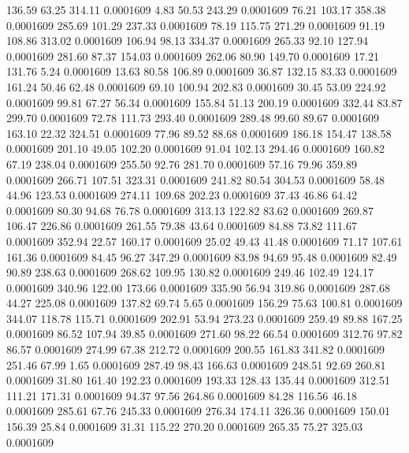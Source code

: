  136.59   63.25  314.11   0.0001609
   4.83   50.53  243.29   0.0001609
  76.21  103.17  358.38   0.0001609
 285.69  101.29  237.33   0.0001609
  78.19  115.75  271.29   0.0001609
  91.19  108.86  313.02   0.0001609
 106.94   98.13  334.37   0.0001609
 265.33   92.10  127.94   0.0001609
 281.60   87.37  154.03   0.0001609
 262.06   80.90  149.70   0.0001609
  17.21  131.76    5.24   0.0001609
  13.63   80.58  106.89   0.0001609
  36.87  132.15   83.33   0.0001609
 161.24   50.46   62.48   0.0001609
  69.10  100.94  202.83   0.0001609
  30.45   53.09  224.92   0.0001609
  99.81   67.27   56.34   0.0001609
 155.84   51.13  200.19   0.0001609
 332.44   83.87  299.70   0.0001609
  72.78  111.73  293.40   0.0001609
 289.48   99.60   89.67   0.0001609
 163.10   22.32  324.51   0.0001609
  77.96   89.52   88.68   0.0001609
 186.18  154.47  138.58   0.0001609
 201.10   49.05  102.20   0.0001609
  91.04  102.13  294.46   0.0001609
 160.82   67.19  238.04   0.0001609
 255.50   92.76  281.70   0.0001609
  57.16   79.96  359.89   0.0001609
 266.71  107.51  323.31   0.0001609
 241.82   80.54  304.53   0.0001609
  58.48   44.96  123.53   0.0001609
 274.11  109.68  202.23   0.0001609
  37.43   46.86   64.42   0.0001609
  80.30   94.68   76.78   0.0001609
 313.13  122.82   83.62   0.0001609
 269.87  106.47  226.86   0.0001609
 261.55   79.38   43.64   0.0001609
  84.88   73.82  111.67   0.0001609
 352.94   22.57  160.17   0.0001609
  25.02   49.43   41.48   0.0001609
  71.17  107.61  161.36   0.0001609
  84.45   96.27  347.29   0.0001609
  83.98   94.69   95.48   0.0001609
  82.49   90.89  238.63   0.0001609
 268.62  109.95  130.82   0.0001609
 249.46  102.49  124.17   0.0001609
 340.96  122.00  173.66   0.0001609
 335.90   56.94  319.86   0.0001609
 287.68   44.27  225.08   0.0001609
 137.82   69.74    5.65   0.0001609
 156.29   75.63  100.81   0.0001609
 344.07  118.78  115.71   0.0001609
 202.91   53.94  273.23   0.0001609
 259.49   89.88  167.25   0.0001609
  86.52  107.94   39.85   0.0001609
 271.60   98.22   66.54   0.0001609
 312.76   97.82   86.57   0.0001609
 274.99   67.38  212.72   0.0001609
 200.55  161.83  341.82   0.0001609
 251.46   67.99    1.65   0.0001609
 287.49   98.43  166.63   0.0001609
 248.51   92.69  260.81   0.0001609
  31.80  161.40  192.23   0.0001609
 193.33  128.43  135.44   0.0001609
 312.51  111.21  171.31   0.0001609
  94.37   97.56  264.86   0.0001609
  84.28  116.56   46.18   0.0001609
 285.61   67.76  245.33   0.0001609
 276.34  174.11  326.36   0.0001609
 150.01  156.39   25.84   0.0001609
  31.31  115.22  270.20   0.0001609
 265.35   75.27  325.03   0.0001609

